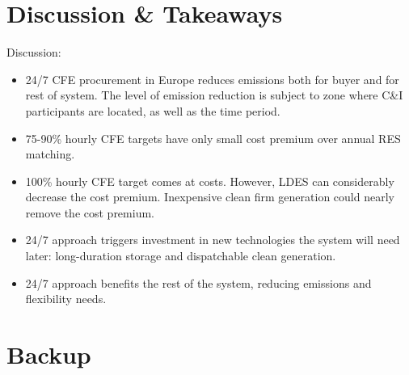 \section{Discussion \& Takeaways}


\begin{frame}{Discussion:}

  \begin{itemize}
  \item 24/7 CFE procurement in Europe \alert{reduces emissions} both for buyer and for rest of system. The level of emission reduction is subject to zone where C\&I participants are located, as well as the time period.
  \item 75-90\% hourly CFE targets have \alert{only small cost premium} over annual RES matching.
  \item 100\% hourly CFE target \alert{comes at costs}. However, LDES can considerably decrease the cost premium. Inexpensive clean firm generation could nearly remove the cost premium.   
  \item 24/7 approach \alert{triggers investment in new technologies} the system will need later: long-duration storage and dispatchable clean generation.
  \item 24/7 approach \alert{benefits the rest of the system}, reducing emissions and flexibility needs.
  \end{itemize}

\end{frame}

\section*{Backup}


